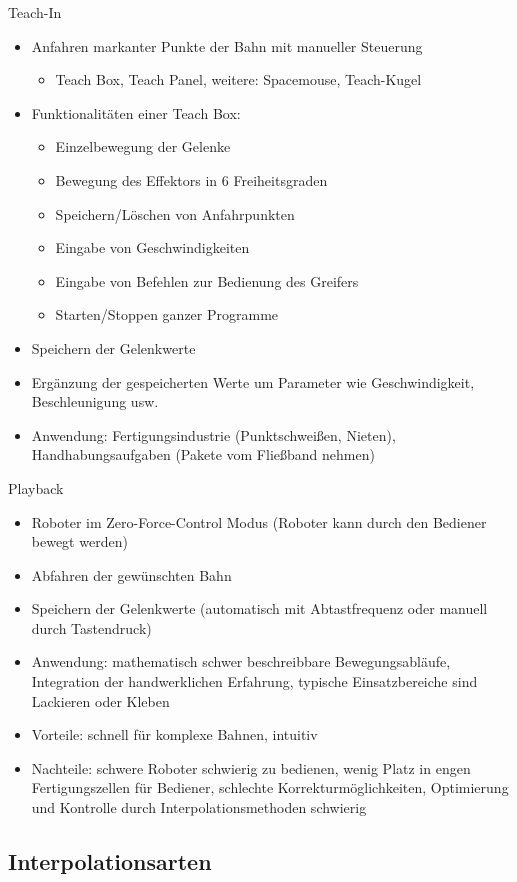 \documentclass[paper=a4, fontsize=11pt]{scrartcl} %
\numberwithin{equation}{section} %
\numberwithin{figure}{section} %
\numberwithin{table}{section} %
\begin{document}
Teach-In
\begin{itemize}
\item Anfahren markanter Punkte der Bahn mit manueller Steuerung
\begin{itemize}
\item Teach Box, Teach Panel, weitere: Spacemouse, Teach-Kugel
\end{itemize}
\item Funktionalitäten einer Teach Box:
\begin{itemize}
\item Einzelbewegung der Gelenke
\item Bewegung des Effektors in 6 Freiheitsgraden
\item Speichern/Löschen von Anfahrpunkten
\item Eingabe von Geschwindigkeiten
\item Eingabe von Befehlen zur Bedienung des Greifers
\item Starten/Stoppen ganzer Programme
\end{itemize}
\item Speichern der Gelenkwerte
\item Ergänzung der gespeicherten Werte um Parameter wie Geschwindigkeit, Beschleunigung usw.
\item Anwendung: Fertigungsindustrie (Punktschweißen, Nieten), Handhabungsaufgaben (Pakete vom Fließband nehmen)
\end{itemize}

Playback
\begin{itemize}
\item Roboter im Zero-Force-Control Modus (Roboter kann durch den Bediener bewegt werden)
\item Abfahren der gewünschten Bahn
\item Speichern der Gelenkwerte (automatisch mit Abtastfrequenz oder manuell durch Tastendruck)
\item Anwendung: mathematisch schwer beschreibbare Bewegungsabläufe, Integration der handwerklichen Erfahrung, typische Einsatzbereiche sind Lackieren oder Kleben
\item Vorteile: schnell für komplexe Bahnen, intuitiv
\item Nachteile: schwere Roboter schwierig zu bedienen, wenig Platz in engen Fertigungszellen für Bediener, schlechte Korrekturmöglichkeiten, Optimierung und Kontrolle durch Interpolationsmethoden schwierig
\end{itemize}

\subsection{Interpolationsarten}
\end{document}
